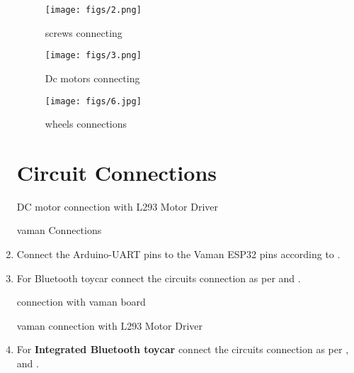 \begin{enumerate}[label=\thesection.\arabic*.,ref=\thesection.\theenumi]
 \begin{figure}[H]
\centering
\texttt{[image: figs/2.png]}
\centering
\caption{screws connecting }
\end{figure}
 
 \begin{figure}[H]
\centering
\texttt{[image: figs/3.png]}
\caption{Dc motors connecting}
\end{figure}
 \begin{figure}[H]
\centering
\texttt{[image: figs/6.jpg]}
\caption{wheels connections }
\end{figure}
\section{Circuit Connections}

\begin{table}[h]
\centering
	
	\caption{DC motor connection with L293 Motor Driver }
	\label{Tab:dcmotor}
\end{table}

\begin{table}[h]
\centering
	
	\caption{ vaman Connections}
	\label{Tab:connections3}
\end{table}
\item Connect the Arduino-UART pins to the Vaman ESP32 pins according to .
\item For Bluetooth toycar connect the circuits connection as per  and  .
\begin{table}[h]
\centering
	
	\caption{connection with vaman board }
	\label{Tab:connections}
\end{table}
\begin{table}[h]
\centering
	
	\caption{vaman connection with L293 Motor Driver}
	\label{Tab:connections2}
\end{table}
\item For \textbf{Integrated Bluetooth toycar} connect the circuits connection as per  ,  and .


\end{enumerate}
